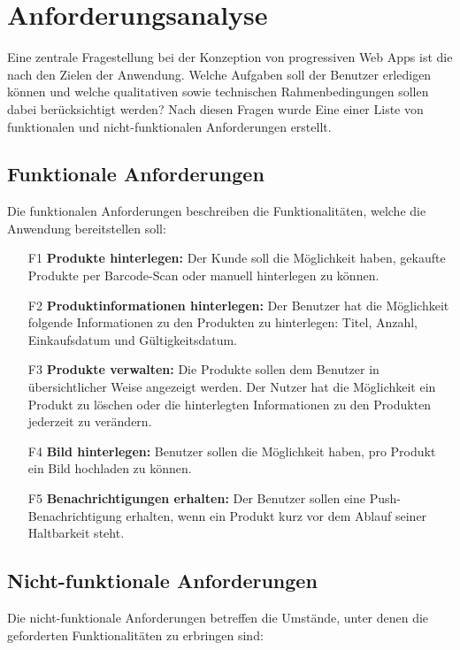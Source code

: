 \section{Anforderungsanalyse}
Eine zentrale Fragestellung bei der Konzeption von progressiven Web Apps ist die nach den Zielen der Anwendung. Welche Aufgaben soll der Benutzer erledigen können und welche qualitativen sowie technischen Rahmenbedingungen sollen dabei berücksichtigt werden? Nach diesen Fragen wurde Eine einer Liste von funktionalen und nicht-funktionalen
Anforderungen erstellt.

\subsection{Funktionale Anforderungen}
Die funktionalen Anforderungen beschreiben die Funktionalitäten, welche die Anwendung bereitstellen soll:
\begin{itemize}[noitemsep]
	\item[F1] \textbf{Produkte hinterlegen:} Der Kunde soll die Möglichkeit haben, gekaufte Produkte per Barcode-Scan oder manuell hinterlegen zu können.
	\item[F2] \textbf{Produktinformationen hinterlegen:} Der Benutzer hat die Möglichkeit folgende Informationen zu den Produkten zu hinterlegen: Titel, Anzahl, Einkaufsdatum und Gültigkeitsdatum.
	\item[F3] \textbf{Produkte verwalten:} Die Produkte sollen dem Benutzer in übersichtlicher Weise angezeigt werden. Der Nutzer hat die Möglichkeit ein Produkt zu löschen oder die hinterlegten Informationen zu den Produkten jederzeit zu verändern.
	\item[F4] \textbf{Bild hinterlegen:} Benutzer sollen die Möglichkeit haben, pro Produkt ein Bild hochladen zu können.
	\item[F5] \textbf{Benachrichtigungen erhalten:} Der Benutzer sollen eine Push-Benachrichtigung erhalten, wenn ein Produkt kurz vor dem Ablauf seiner Haltbarkeit steht.
\end{itemize}

\subsection{Nicht-funktionale Anforderungen}
Die nicht-funktionale Anforderungen betreffen die Umstände, unter denen die geforderten Funktionalitäten zu erbringen sind:

